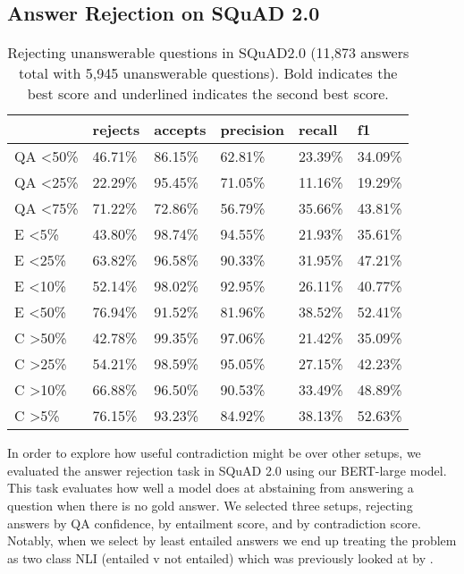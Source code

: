 \documentclass[11pt]{article}
\begin{document}
\subsection{Answer Rejection on SQuAD 2.0}
\begin{table*}[t!]
\centering
\begin{tabular}{llllll}
\hline
 & rejects & accepts & precision & recall & f1 \\ \hline
QA \textless 50\% & 46.71\% & 86.15\% & 62.81\% & 23.39\% & 34.09\% \\
QA \textless 25\% & 22.29\% & 95.45\% & 71.05\% & 11.16\% & 19.29\% \\
QA  \textless 75\% & 71.22\% & 72.86\% & 56.79\% & 35.66\% & 43.81\% \\
E \textless 5\% & 43.80\% & 98.74\% & 94.55\% & 21.93\% & 35.61\% \\
E \textless 25\% & 63.82\% & 96.58\% & 90.33\% & 31.95\% & 47.21\% \\
E \textless 10\% & 52.14\% & 98.02\% & 92.95\% & 26.11\% & 40.77\% \\
E \textless  50\% & 76.94\% & 91.52\% & 81.96\% & 38.52\% & 52.41\% \\
C \textgreater 50\% & 42.78\% & 99.35\% & 97.06\% & 21.42\% & 35.09\% \\
C \textgreater 25\% & 54.21\% & 98.59\% & 95.05\% & 27.15\% & 42.23\% \\
C \textgreater 10\% & 66.88\% & 96.50\% & 90.53\% & 33.49\% & 48.89\% \\
C \textgreater  5\% & 76.15\% & 93.23\% & 84.92\% & 38.13\% & 52.63\% \\ \hline
\end{tabular}
\caption{Rejecting unanswerable questions in SQuAD2.0 (11,873 answers total with 5,945 unanswerable questions). Bold indicates the best score and underlined indicates the second best score.}
\label{tab:rejecting}
\end{table*}
In order to explore how useful contradiction might be over other setups, we evaluated the answer rejection task in SQuAD 2.0 \citep{rajpurkar_know_2018} using our BERT-large model. This task evaluates how well a model does at abstaining from answering a question when there is no gold answer. We selected three setups, rejecting answers by QA confidence, by entailment score, and by contradiction score. Notably, when we select by least entailed answers we end up treating the problem as two class NLI (entailed v not entailed) which was previously looked at by \citet{chen_can_2021}.
\end{document}
